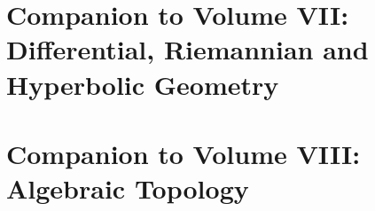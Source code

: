 \documentclass[11pt,a4paper,oneside,openany]{book}
\begin{document}
\part{Companion to Volume VII: Differential, Riemannian and Hyperbolic Geometry}


\part{Companion to Volume VIII: Algebraic Topology}


\backmatter

\end{document}
